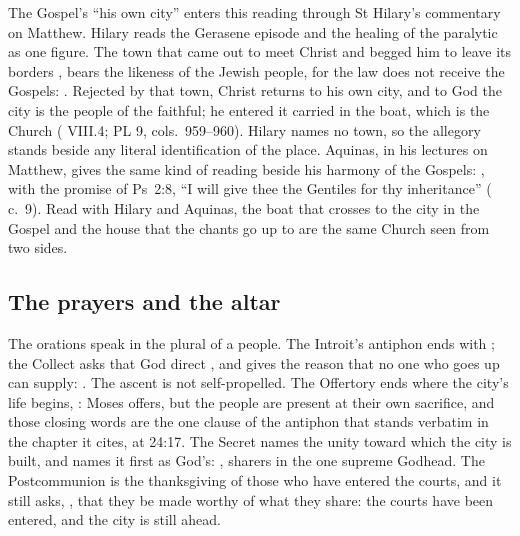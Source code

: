 The Gospel's ``his own city'' enters this reading through St Hilary's
commentary on Matthew. Hilary reads the Gerasene episode and the healing of the
paralytic as one figure. The town that came out to meet Christ and begged him
to leave its borders , bears the likeness
of the Jewish people, for the law does not receive the Gospels: . Rejected by that town,
Christ returns to his own city, and to God the city is the people of the
faithful; he entered it carried in the boat, which is the Church
( VIII.4; PL 9, cols.~959--960). Hilary names
no town, so the allegory stands beside any literal identification of the place.
Aquinas, in his lectures on Matthew, gives the same kind of reading beside his
harmony of the Gospels: , with the promise of
Ps~2:8, ``I will give thee the Gentiles for thy inheritance'' ( c.~9). Read with Hilary and Aquinas, the boat that crosses to the
city in the Gospel and the house that the chants go up to are the same Church
seen from two sides.

\subsection{The prayers and the altar}

The orations speak in the plural of a people. The Introit's antiphon ends with
; the Collect asks that God direct , and gives the reason that no one who goes up can supply: . The ascent is not self-propelled. The Offertory
ends where the city's life begins, : Moses
offers, but the people are present at their own sacrifice, and those closing
words are the one clause of the antiphon that stands verbatim in the chapter it
cites, at 24:17. The Secret names the unity toward which the city is built, and
names it first as God's: , sharers
in the one supreme Godhead. The Postcommunion is the thanksgiving of those who
have entered the courts, and it still asks, , that they be made worthy of what they share: the
courts have been entered, and the city is still ahead.

